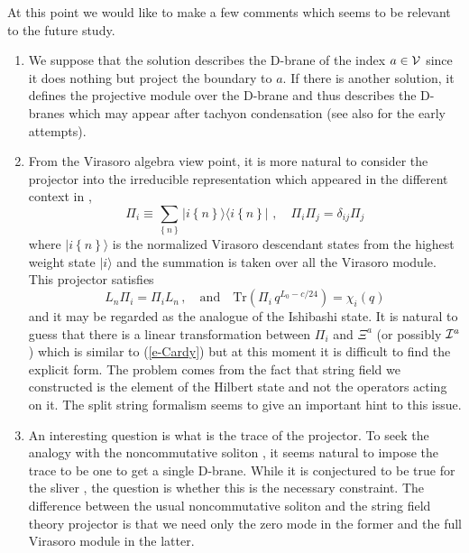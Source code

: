 \documentclass[a4paper,12pt]{article}
\begin{document}
At this point we would like to make a few comments
which seems to be relevant to the future study.
\begin{enumerate}
\item We suppose that the solution describes
the D-brane of the index $a\in\cal V$
since it does nothing but project the boundary to $a$.
If there is another solution, it defines the projective
module over the D-brane and thus describes the D-branes
which may appear after tachyon condensation \cite{r-Sen}
(see also \cite{r-hist} for the early attempts).
 \item From the Virasoro algebra view point, it is more
natural to consider the projector 
into the irreducible representation which appeared
in the different context in \cite{r-BPPZ},
\begin{equation}\label{e-proj2}
 \Pi_{i}\equiv\sum_{\left\{n\right\}}|i\left\{n
\right\}\rangle
\langle i\left\{n\right\}|\,\,,\quad
\Pi_i\Pi_j=\delta_{ij}\Pi_j
\end{equation}
where $|i\left\{n\right\}\rangle$ is the
normalized Virasoro descendant states from the highest weight state
$|i\rangle$ and the summation is taken over all the 
Virasoro module. This projector satisfies 
\begin{equation}
L_n \Pi_{i}=\Pi_{i} L_n\,,\quad\mbox{and}\quad
\mbox{Tr}(\Pi_i\,q^{L_0-c/24})=\chi_i(q)
\end{equation}
and it may be regarded as
the analogue of the Ishibashi state.
It is natural to guess
that there is a linear transformation 
between $\Pi_i$ and $\Xi^a$ (or possibly ${\cal I}^a$) 
which is similar to (\ref{e-Cardy})
but at this moment it is difficult
to find the explicit form.
The problem comes from the fact that string field we constructed
is the element of the Hilbert state and not 
the operators acting on it.  The split string formalism
\cite{r-Witten,r-RSZ2,r-GT,r-KO} seems to give an important hint to this issue.
\item An interesting question is what is the trace
of the projector. To seek the analogy with the noncommutative
soliton \cite{r-HKLM}, it seems natural to impose the trace to 
be one to get a single D-brane.
While it is conjectured to be true for the sliver \cite{r-RSZ1,r-RSZ2},
the question is  whether this is the necessary constraint.
The difference between the usual noncommutative
soliton and the string field theory projector
is that we need only the zero mode in the former and
the full Virasoro module in the latter.


\end{enumerate}
\end{document}
